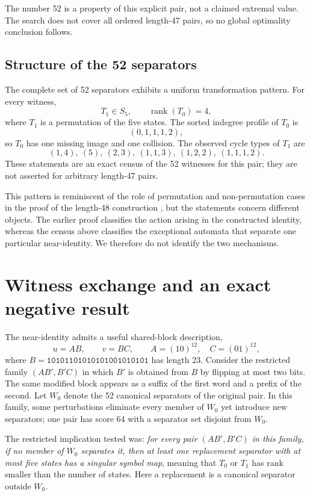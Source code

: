 \documentclass[10pt]{article}
\begin{document}
The number 52 is a property of this explicit pair, not a claimed extremal value.  The search does not cover all ordered length-47 pairs, so no global optimality conclusion follows.

\subsection{Structure of the 52 separators}
The complete set of 52 separators exhibits a uniform transformation pattern.  For every witness,
\[
T_1\in S_5,\qquad \operatorname{rank}(T_0)=4,
\]
where $T_1$ is a permutation of the five states.  The sorted indegree profile of $T_0$ is
\[
(0,1,1,1,2),
\]
so $T_0$ has one missing image and one collision.  The observed cycle types of $T_1$ are
\[
(1,4),\ (5),\ (2,3),\ (1,1,3),\ (1,2,2),\ (1,1,1,2).
\]
These statements are an exact census of the 52 witnesses for this pair; they are not asserted for arbitrary length-47 pairs.

This pattern is reminiscent of the role of permutation and non-permutation cases in the proof of the length-48 construction \cite{BKSS2017}, but the statements concern different objects.  The earlier proof classifies the action arising in the constructed identity, whereas the census above classifies the exceptional automata that separate one particular near-identity.  We therefore do not identify the two mechanisms.

\section{Witness exchange and an exact negative result}
The near-identity admits a useful shared-block description,
\[
u=AB,\qquad v=BC,\qquad A=(10)^{12},\quad C=(01)^{12},
\]
where $B=\texttt{10101101010101001010101}$ has length 23.  Consider the restricted family $(AB',B'C)$ in which $B'$ is obtained from $B$ by flipping at most two bits.  The same modified block appears as a suffix of the first word and a prefix of the second.  Let $W_0$ denote the 52 canonical separators of the original pair.  In this family, some perturbations eliminate every member of $W_0$ yet introduce new separators; one pair has score 64 with a separator set disjoint from $W_0$.

The restricted implication tested was: \emph{for every pair $(AB',B'C)$ in this family, if no member of $W_0$ separates it, then at least one replacement separator with at most five states has a singular symbol map}, meaning that $T_0$ or $T_1$ has rank smaller than the number of states.  Here a replacement is a canonical separator outside $W_0$.
\end{document}

